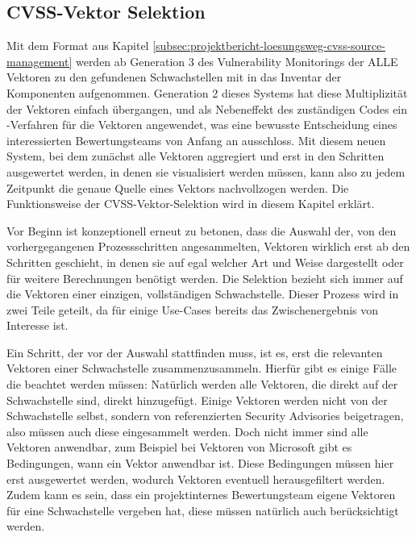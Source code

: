 \subsection{CVSS-Vektor Selektion} \label{subsec:projektbericht-loesungsweg-cvss-selection}

Mit dem Format aus Kapitel \ref{subsec:projektbericht-loesungsweg-cvss-source-management} werden ab Generation 3 des Vulnerability Monitorings der {\metaeffekt} ALLE Vektoren zu den gefundenen Schwachstellen mit in das Inventar der Komponenten aufgenommen.
Generation 2 dieses Systems hat diese Multiplizität der Vektoren einfach übergangen, und als Nebeneffekt des zuständigen Codes ein -Verfahren für die Vektoren angewendet, was eine bewusste Entscheidung eines interessierten Bewertungsteams von Anfang an ausschloss.
Mit diesem neuen System, bei dem zunächst alle Vektoren aggregiert und erst in den Schritten ausgewertet werden, in denen sie visualisiert werden müssen, kann also zu jedem Zeitpunkt die genaue Quelle eines Vektors nachvollzogen werden.
Die Funktionsweise der CVSS-Vektor-Selektion wird in diesem Kapitel erklärt.

Vor Beginn ist konzeptionell erneut zu betonen, dass die Auswahl der, von den vorhergegangenen Prozessschritten angesammelten, Vektoren wirklich erst ab den Schritten geschieht, in denen sie auf egal welcher Art und Weise dargestellt oder für weitere Berechnungen benötigt werden.
Die Selektion bezieht sich immer auf die Vektoren einer einzigen, vollständigen Schwachstelle.
Dieser Prozess wird in zwei Teile geteilt, da für einige Use-Cases bereits das Zwischenergebnis von Interesse ist.

Ein Schritt, der vor der Auswahl stattfinden muss, ist es, erst die relevanten Vektoren einer Schwachstelle zusammenzusammeln.
Hierfür gibt es einige Fälle die beachtet werden müssen:
Natürlich werden alle Vektoren, die direkt auf der Schwachstelle sind, direkt hinzugefügt.
Einige Vektoren werden nicht von der Schwachstelle selbst, sondern von referenzierten Security Advisories beigetragen, also müssen auch diese eingesammelt werden.
Doch nicht immer sind alle Vektoren anwendbar, zum Beispiel bei Vektoren von Microsoft gibt es Bedingungen, wann ein Vektor anwendbar ist.
Diese Bedingungen müssen hier erst ausgewertet werden, wodurch Vektoren eventuell herausgefiltert werden.
Zudem kann es sein, dass ein projektinternes Bewertungsteam eigene Vektoren für eine Schwachstelle vergeben hat, diese müssen natürlich auch berücksichtigt werden.


